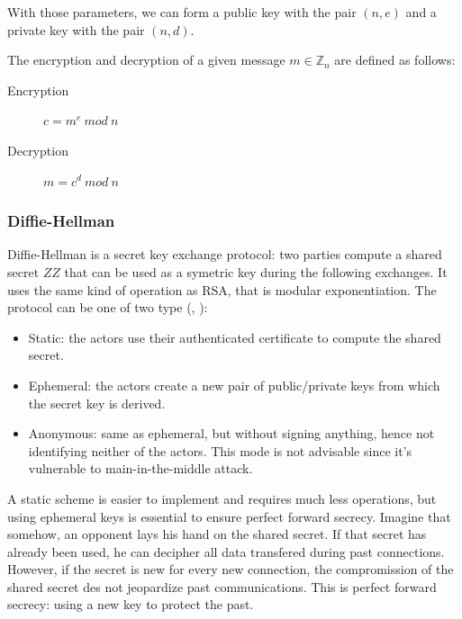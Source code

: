 With those parameters, we can form a public key with the pair $(n, e)$ and a private key with the pair $(n, d)$.

The encryption and decryption of a given message $m \in \mathds{Z}_n$ are defined as follows:
\begin{description}
	\item[Encryption] $c = m^e\ mod\ n$
	\item[Decryption] $m = c^d\ mod\ n$
\end{description}


\subsubsection{Diffie-Hellman}
Diffie-Hellman is a secret key exchange protocol: two parties compute a shared secret $ZZ$ that can be used as a symetric key during the following exchanges.
It uses the same kind of operation as RSA, that is modular exponentiation.
The protocol can be one of two type (\cite{rfc2631}, \cite{Frankel:2005:SGI:2206289}):
\begin{itemize}
	\item Static: the actors use their authenticated certificate to compute the shared secret.
	\item Ephemeral: the actors create a new pair of public/private keys from which the secret key is derived.
	\item Anonymous: same as ephemeral, but without signing anything, hence not identifying neither of the actors. This mode is not advisable since it's vulnerable to main-in-the-middle attack.
\end{itemize}
A static scheme is easier to implement and requires much less operations, but using ephemeral keys is essential to ensure perfect forward secrecy.
Imagine that somehow, an opponent lays his hand on the shared secret.
If that secret has already been used, he can decipher all data transfered during past connections.
However, if the secret is new for every new connection, the compromission of the shared secret des not jeopardize past communications.
This is perfect forward secrecy: using a new key to protect the past.

